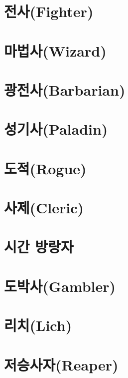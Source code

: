 \documentclass{report}
\begin{document}
	\section{전사(Fighter)}
		
	
	\section{마법사(Wizard)}
		
	
	\section{광전사(Barbarian)}
		
	
	\section{성기사(Paladin)}
		
	
	\section{도적(Rogue)}
		
	
	\section{사제(Cleric)}
		
	
	\section{시간 방랑자}
		
		
	\section{도박사(Gambler)}
		
	
	\section{리치(Lich)}
		
	
	\section{저승사자(Reaper)}
		
\end{document}
